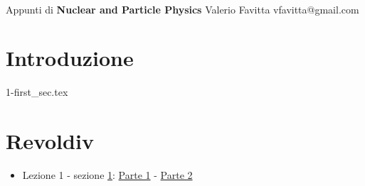 \documentclass[11pt]{article}
\begin{document}
\thispagestyle{empty}
\bigskip \
\vspace{0.1cm}

\begin{center}
{\fontsize{22}{22} \selectfont Appunti di}
\vskip 16pt
{\fontsize{36}{36} \selectfont \bf \sffamily Nuclear and Particle Physics}
\vskip 24pt
{\fontsize{18}{18} \selectfont \rmfamily Valerio Favitta} 
\vskip 6pt
{\fontsize{14}{14} \selectfont \ttfamily vfavitta@gmail.com} 
\vskip 24pt
\end{center}

{\parindent0pt \baselineskip=15.5pt \lipsum[1-4]}

\newpage
\microtoc
\newpage

\section{Introduzione}\label{sec:intro}
{1-first_sec.tex}

\appendix
\section{Revoldiv}
\begin{itemize}
    \item Lezione 1 - sezione \ref{sec:intro}: \href{https://revoldiv.com/posts/3e690ced-59b5-4a12-afd3-b81f8b8bc33e/}{Parte 1} - \href{https://revoldiv.com/posts/c176a40e-37f7-42c6-8d04-7b0202a01a87/}{Parte 2}
\end{itemize}
\end{document}
